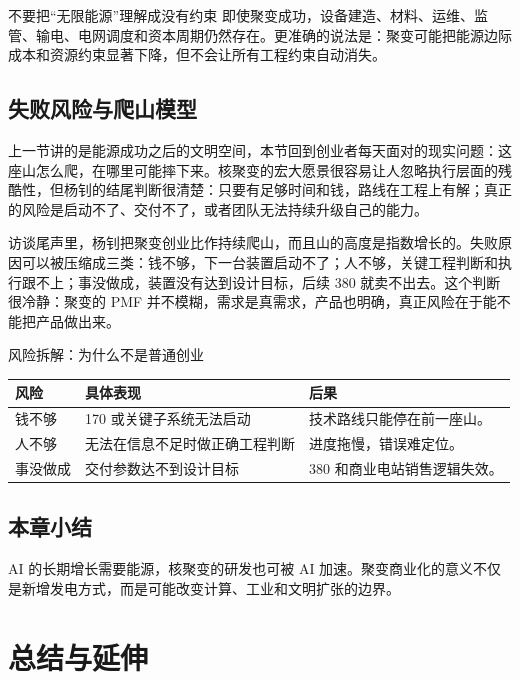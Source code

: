 \documentclass[a4paper]{article}
\begin{document}
\begin{warningbox}{不要把“无限能源”理解成没有约束}
即使聚变成功，设备建造、材料、运维、监管、输电、电网调度和资本周期仍然存在。更准确的说法是：聚变可能把能源边际成本和资源约束显著下降，但不会让所有工程约束自动消失。
\end{warningbox}

\subsection{失败风险与爬山模型}

上一节讲的是能源成功之后的文明空间，本节回到创业者每天面对的现实问题：这座山怎么爬，在哪里可能摔下来。核聚变的宏大愿景很容易让人忽略执行层面的残酷性，但杨钊的结尾判断很清楚：只要有足够时间和钱，路线在工程上有解；真正的风险是启动不了、交付不了，或者团队无法持续升级自己的能力。

访谈尾声里，杨钊把聚变创业比作持续爬山，而且山的高度是指数增长的。失败原因可以被压缩成三类：钱不够，下一台装置启动不了；人不够，关键工程判断和执行跟不上；事没做成，装置没有达到设计目标，后续 380 就卖不出去。这个判断很冷静：聚变的 PMF 并不模糊，需求是真需求，产品也明确，真正风险在于能不能把产品做出来。

\begin{knowledgebox}{风险拆解：为什么不是普通创业}
\begin{tabularx}{\textwidth}{p{}p{}X}
\toprule
风险 & 具体表现 & 后果 \\
\midrule
钱不够 & 170 或关键子系统无法启动 & 技术路线只能停在前一座山。 \\
人不够 & 无法在信息不足时做正确工程判断 & 进度拖慢，错误难定位。 \\
事没做成 & 交付参数达不到设计目标 & 380 和商业电站销售逻辑失效。 \\
\bottomrule
\end{tabularx}
\end{knowledgebox}

\subsection{本章小结}

AI 的长期增长需要能源，核聚变的研发也可被 AI 加速。聚变商业化的意义不仅是新增发电方式，而是可能改变计算、工业和文明扩张的边界。

\section{总结与延伸}
\end{document}
